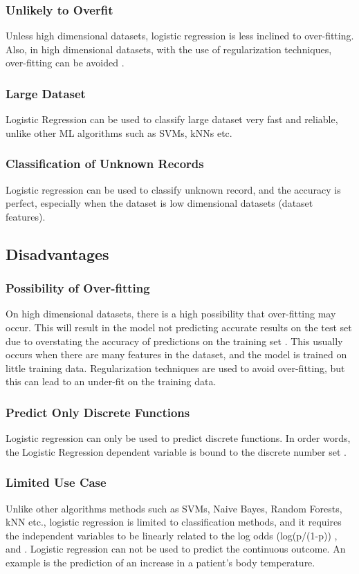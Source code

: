 \documentclass[conference]{IEEEtran}
\begin{document}
\subsubsection{Unlikely to Overfit}
Unless high dimensional datasets, logistic regression is less inclined to over-fitting. Also, in high dimensional datasets, with the use of regularization techniques, over-fitting can be avoided \cite{cc7}. 

\subsubsection{Large Dataset}
Logistic Regression can be used to classify large dataset very fast and reliable, unlike other ML algorithms such as SVMs, kNNs etc.

\subsubsection{Classification of Unknown Records}
Logistic regression can be used to classify unknown record, and the accuracy is perfect, especially when the dataset is low dimensional datasets (dataset features).

\subsection{Disadvantages}

\subsubsection{Possibility of Over-fitting}
On high dimensional datasets, there is a high possibility that over-fitting may occur. This will result in the model not predicting accurate results on the test set due to overstating the accuracy of predictions on the training set \cite{cc8}. This usually occurs when there are many features in the dataset, and the model is trained on little training data. Regularization techniques are used to avoid over-fitting, but this can lead to an under-fit on the training data.

\subsubsection{Predict Only Discrete Functions}
Logistic regression can only be used to predict discrete functions. In order words, the Logistic Regression dependent variable is bound to the discrete number set \cite{cc7}.

\subsubsection{Limited Use Case}
Unlike other algorithms methods such as SVMs, Naive Bayes, Random Forests, kNN etc., logistic regression is limited to classification methods, and it requires the independent variables to be linearly related to the log odds (log(p/(1-p)) \cite{cc7}, and \cite{cc8}. Logistic regression can not be used to predict the continuous outcome. An example is the prediction of an increase in a patient’s body temperature. 
\end{document}

